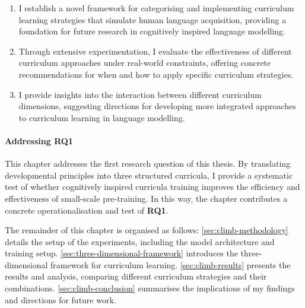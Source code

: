 \begin{enumerate}
    \item I establish a novel framework for categorising and implementing curriculum learning strategies that simulate human language acquisition, providing a foundation for future research in cognitively inspired language modelling.
    
    \item Through extensive experimentation, I evaluate the effectiveness of different curriculum approaches under real-world constraints, offering concrete recommendations for when and how to apply specific curriculum strategies.
    
    
    \item I provide insights into the interaction between different curriculum dimensions, suggesting directions for developing more integrated approaches to curriculum learning in language modelling.
\end{enumerate}

\paragraph{Addressing RQ1} This chapter addresses the first research question of this thesis. By translating developmental principles into three structured curricula, I provide a systematic test of whether cognitively inspired curricula training improves the efficiency and effectiveness of small-scale pre-training. In this way, the chapter contributes a concrete operationalisation and test of \textbf{RQ1}. 

\vspace{1em}

The remainder of this chapter is organised as follows: \cref{sec:climb-methodology} details the setup of the experiments, including the model architecture and training setup. \cref{sec:three-dimensional-framework} introduces the three-dimensional framework for curriculum learning. \cref{sec:climb-results} presents the results and analysis, comparing different curriculum strategies and their combinations. \cref{sec:climb-conclusion} summarises the implications of my findings and directions for future work.

